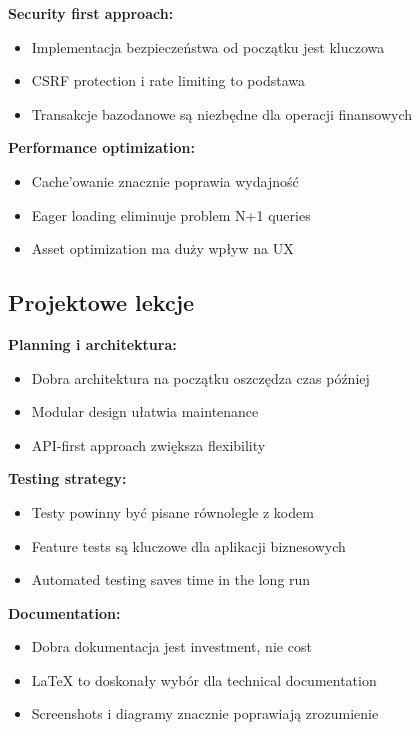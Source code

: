 \documentclass[12pt,a4paper]{article}
\begin{document}
    \textbf{Security first approach:}
    \begin{itemize}
        \item Implementacja bezpieczeństwa od początku jest kluczowa
        \item CSRF protection i rate limiting to podstawa
        \item Transakcje bazodanowe są niezbędne dla operacji finansowych
    \end{itemize}

    \textbf{Performance optimization:}
    \begin{itemize}
        \item Cache'owanie znacznie poprawia wydajność
        \item Eager loading eliminuje problem N+1 queries
        \item Asset optimization ma duży wpływ na UX
    \end{itemize}

    \subsection{Projektowe lekcje}

    \textbf{Planning i architektura:}
    \begin{itemize}
        \item Dobra architektura na początku oszczędza czas później
        \item Modular design ułatwia maintenance
        \item API-first approach zwiększa flexibility
    \end{itemize}

    \textbf{Testing strategy:}
    \begin{itemize}
        \item Testy powinny być pisane równolegle z kodem
        \item Feature tests są kluczowe dla aplikacji biznesowych
        \item Automated testing saves time in the long run
    \end{itemize}

    \textbf{Documentation:}
    \begin{itemize}
        \item Dobra dokumentacja jest investment, nie cost
        \item LaTeX to doskonały wybór dla technical documentation
        \item Screenshots i diagramy znacznie poprawiają zrozumienie
    \end{itemize}
\end{document}
